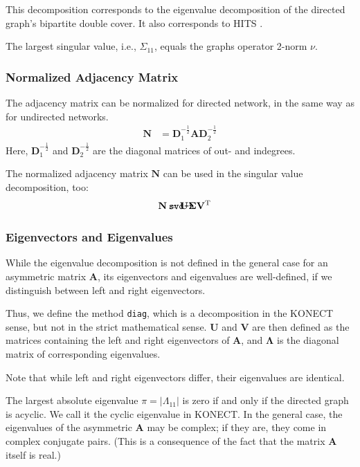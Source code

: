 \documentclass{article}
\def\mathnote#1{%
  \tag*{\rlap{\hspace\marginparsep\smash{\parbox[t]{\marginparwidth}{#1}}}}
}
\begin{document}
This decomposition corresponds to the eigenvalue decomposition of the
directed graph's bipartite double cover. 
It also corresponds to HITS \citep[Hyperlink-Induced Topic Search, ][]{b27}.

The largest singular value, i.e., $\Sigma_{11}$, equals the graphs
operator 2-norm $\nu$. 

\subsubsection{Normalized Adjacency Matrix}
\label{sec:decomposition.svd-n}
The adjacency matrix can be normalized for directed network, in the same
way as for undirected networks.
\begin{align}
  \mathbf N &= \mathbf D_1^{-\frac 1 2} \mathbf A \mathbf D_2^{-\frac 1 2}
\end{align}
Here, $\mathbf D_1^{-\frac 1 2}$ and $\mathbf D_2^{-\frac 1 2}$
are the diagonal matrices of out- and indegrees. 

The normalized adjacency matrix $\mathbf N$ can be used in the singular
value decomposition, too:
\begin{align}
  \mathnote{\texttt{svd-n}}
  \mathbf N &= \mathbf U \mathbf \Sigma \mathbf V^{\mathrm T}
\end{align}

\subsubsection{Eigenvectors and Eigenvalues}
\label{sec:matrix.diag}
While the eigenvalue decomposition is not defined in the general case
for an asymmetric matrix $\mathbf A$, its eigenvectors and eigenvalues
are well-defined, if we distinguish between left and right
eigenvectors.

Thus, we define the method \texttt{diag}, which is a decomposition in
the KONECT sense, but not in the strict mathematical sense. 
$\mathbf U$ and $\mathbf V$ are then defined as the matrices containing
the left and right eigenvectors of $\mathbf A$, and $\mathbf \Lambda$ is
the diagonal matrix of corresponding eigenvalues. 

Note that while left and right eigenvectors differ, their eigenvalues
are identical. 

The largest absolute eigenvalue $\pi=|\Lambda_{11}|$ is zero if and only
if the directed graph is acyclic.  We call it the cyclic eigenvalue in
KONECT.  
In the general case, the eigenvalues of the asymmetric $\mathbf A$ may
be complex; if they are, they come in complex conjugate pairs. (This is
a consequence of the fact that the matrix $\mathbf A$ itself is real.)
\end{document}
